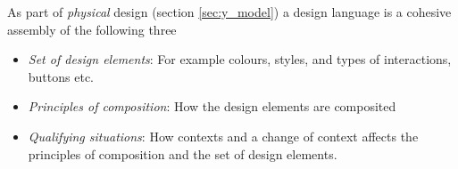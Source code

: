 \begin{definition} \label{def:design_language} 
  As part of \emph{physical} design (section \ref{sec:y_model}) a design language is a cohesive assembly of the following three \cite[p. 203-204]{benyon14}
  \begin{itemize}
    \item \emph{Set of design elements}: For example colours, styles, and types of interactions, buttons etc.
    \item \emph{Principles of composition}: How the design elements are composited
    \item \emph{Qualifying situations}: How contexts and a change of context affects the principles of composition and the set of design elements.
  \end{itemize}
\end{definition}
